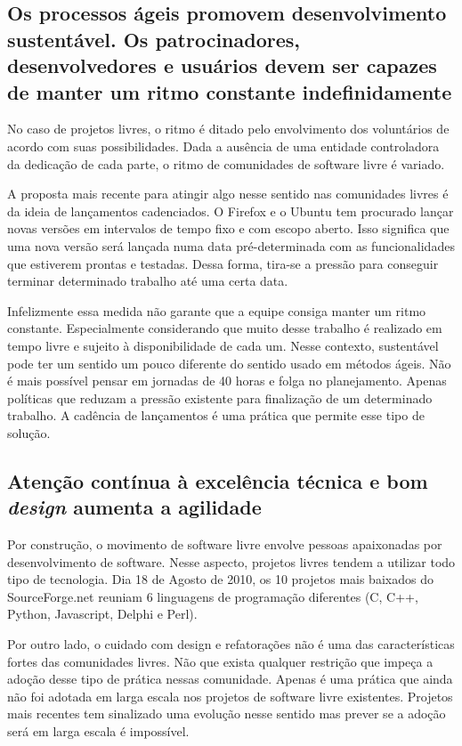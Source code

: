 \subsection[Ritmo sustentável]{Os processos ágeis promovem
  desenvolvimento sustentável. Os patrocinadores, desenvolvedores e
  usuários devem ser capazes de manter um ritmo constante
  indefinidamente}

No caso de projetos livres, o ritmo é ditado pelo envolvimento dos
voluntários de acordo com suas possibilidades. Dada a ausência de uma
entidade controladora da dedicação de cada parte, o ritmo de
comunidades de software livre é variado.

A proposta mais recente para atingir algo nesse sentido nas
comunidades livres é da ideia de lançamentos cadenciados. O Firefox e
o Ubuntu tem procurado lançar novas versões em intervalos de tempo
fixo e com escopo aberto. Isso significa que uma nova versão será
lançada numa data pré-determinada com as funcionalidades que estiverem
prontas e testadas.  Dessa forma, tira-se a pressão para conseguir
terminar determinado trabalho até uma certa data.

Infelizmente essa medida não garante que a equipe consiga manter um
ritmo constante. Especialmente considerando que muito desse trabalho é
realizado em tempo livre e sujeito à disponibilidade de cada um. Nesse
contexto, sustentável pode ter um sentido um pouco diferente do
sentido usado em métodos ágeis. Não é mais possível pensar em jornadas
de 40 horas e folga no planejamento. Apenas políticas que reduzam a
pressão existente para finalização de um determinado trabalho. A
cadência de lançamentos é uma prática que permite esse tipo de
solução.

\subsection[Excelência técnica]{Atenção contínua à excelência técnica
  e bom \textit{design} aumenta a agilidade}

Por construção, o movimento de software livre envolve pessoas
apaixonadas por desenvolvimento de software. Nesse aspecto, projetos
livres tendem a utilizar todo tipo de tecnologia.  Dia 18 de Agosto de
2010, os 10 projetos mais baixados do SourceForge.net reuniam 6
linguagens de programação diferentes (C, C++, Python, Javascript,
Delphi e Perl).

Por outro lado, o cuidado com design e refatorações não é uma das
características fortes das comunidades livres. Não que exista qualquer
restrição que impeça a adoção desse tipo de prática nessas
comunidade. Apenas é uma prática que ainda não foi adotada em larga
escala nos projetos de software livre existentes. Projetos mais
recentes tem sinalizado uma evolução nesse sentido mas prever se a
adoção será em larga escala é impossível.

